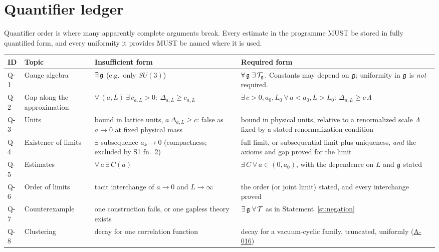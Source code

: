 \documentclass[11pt,a4paper]{article}
\newcommand{\idref}[1]{\hyperref[#1]{\textsf{#1}}}
\begin{document}
\section{Quantifier ledger}\label{sec:quantifiers}

Quantifier order is where many apparently complete arguments break. Every estimate in the programme MUST be stored in fully quantified form, and every uniformity it provides MUST be named where it is used.

\begin{center}\small
\begin{tabularx}{\textwidth}{@{}p{0.8cm}p{2.6cm}XX@{}}
\toprule
ID & Topic & Insufficient form & Required form\\
\midrule
\leavevmode{}\label{Q-1}\textsf{Q-1} & Gauge algebra & $\exists\,\mathfrak g$ (e.g.\ only $SU(3)$) & $\forall\,\g\ \exists\,\cT_\g$. Constants may depend on $\mathfrak g$; uniformity in $\mathfrak g$ is \emph{not} required.\\
\leavevmode{}\label{Q-2}\textsf{Q-2} & Gap along the approximation & $\forall\,(a,L)\ \exists\,c_{a,L}>0:\ \Delta_{a,L}\ge c_{a,L}$ & $\exists\,c>0,a_0,L_0\ \forall\,a<a_0,L>L_0:\ \Delta_{a,L}\ge c\,\Lambda$\\
\leavevmode{}\label{Q-3}\textsf{Q-3} & Units & bound in lattice units, $a\,\Delta_{a,L}\ge c$: false as $a\to0$ at fixed physical mass & bound in physical units, relative to a renormalized scale $\Lambda$ fixed by a stated renormalization condition\\
\leavevmode{}\label{Q-4}\textsf{Q-4} & Existence of limits & $\exists$ subsequence $a_k\to0$ (compactness; excluded by S1 fn.~2) & full limit, or subsequential limit plus uniqueness, \emph{and} the axioms and gap proved for the limit\\
\leavevmode{}\label{Q-5}\textsf{Q-5} & Estimates & $\forall\,a\ \exists\,C(a)$ & $\exists\,C\ \forall\,a\in(0,a_0)$, with the dependence on $L$ and $\mathfrak g$ stated\\
\leavevmode{}\label{Q-6}\textsf{Q-6} & Order of limits & tacit interchange of $a\to0$ and $L\to\infty$ & the order (or joint limit) stated, and every interchange proved\\
\leavevmode{}\label{Q-7}\textsf{Q-7} & Counterexample & one construction fails, or one gapless theory exists & $\exists\,\g\ \forall\,\cT$ as in Statement~\ref{st:negation}\\
\leavevmode{}\label{Q-8}\textsf{Q-8} & Clustering & decay for one correlation function & decay for a vacuum-cyclic family, truncated, uniformly (\idref{A-016})\\
\bottomrule
\end{tabularx}
\end{center}
\end{document}
